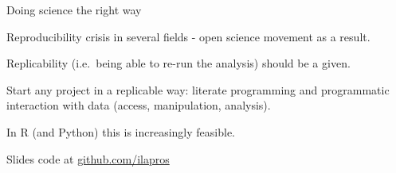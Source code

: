 \documentclass[
  10pt,
  ignorenonframetext,
  compress]{beamer}
\begin{document}
\begin{frame}{Doing science the right way}
\protect\hypertarget{doing-science-the-right-way}{}

Reproducibility crisis in several fields - open science movement as a
result.

Replicability (i.e.~being able to re-run the analysis) should be a
given.

Start any project in a replicable way: literate programming and
programmatic interaction with data (access, manipulation, analysis).

In R (and Python) this is increasingly feasible.

Slides code at
\href{https://github.com/ilapros/PerugiaSummerSchool/tree/master/July2020}{github.com/ilapros}

\end{frame}
\end{document}
